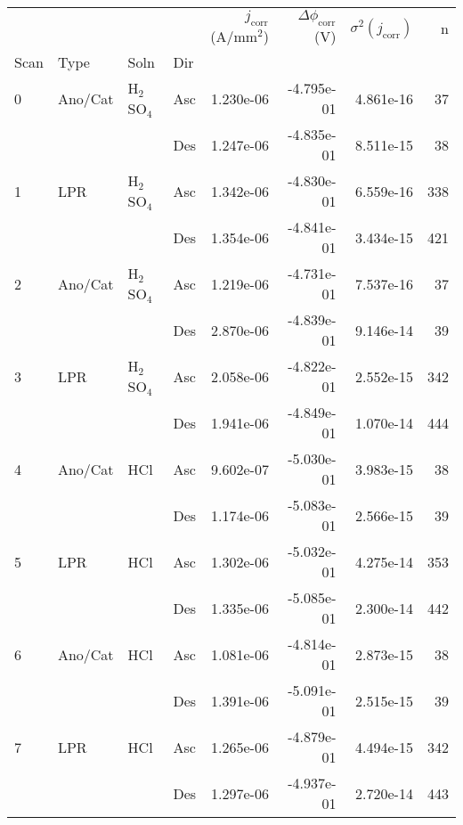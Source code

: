 \begin{tabular}{llllrrrr}
\toprule
  &     &     &     &  $j_{\text{corr}}$ (A/mm$^2$) &  $\Delta \phi_{\text{corr}}$ (V) &  $\sigma^2(j_{\text{corr}})$ &    n \\
Scan & Type & Soln & Dir &                               &                                  &                              &      \\
\midrule
0 & Ano/Cat & H$_2$SO$_4$ & Asc &                     1.230e-06 &                       -4.795e-01 &                    4.861e-16 &   37 \\
  &     &     & Des &                     1.247e-06 &                       -4.835e-01 &                    8.511e-15 &   38 \\
1 & LPR & H$_2$SO$_4$ & Asc &                     1.342e-06 &                       -4.830e-01 &                    6.559e-16 &  338 \\
  &     &     & Des &                     1.354e-06 &                       -4.841e-01 &                    3.434e-15 &  421 \\
2 & Ano/Cat & H$_2$SO$_4$ & Asc &                     1.219e-06 &                       -4.731e-01 &                    7.537e-16 &   37 \\
  &     &     & Des &                     2.870e-06 &                       -4.839e-01 &                    9.146e-14 &   39 \\
3 & LPR & H$_2$SO$_4$ & Asc &                     2.058e-06 &                       -4.822e-01 &                    2.552e-15 &  342 \\
  &     &     & Des &                     1.941e-06 &                       -4.849e-01 &                    1.070e-14 &  444 \\
4 & Ano/Cat & HCl & Asc &                     9.602e-07 &                       -5.030e-01 &                    3.983e-15 &   38 \\
  &     &     & Des &                     1.174e-06 &                       -5.083e-01 &                    2.566e-15 &   39 \\
5 & LPR & HCl & Asc &                     1.302e-06 &                       -5.032e-01 &                    4.275e-14 &  353 \\
  &     &     & Des &                     1.335e-06 &                       -5.085e-01 &                    2.300e-14 &  442 \\
6 & Ano/Cat & HCl & Asc &                     1.081e-06 &                       -4.814e-01 &                    2.873e-15 &   38 \\
  &     &     & Des &                     1.391e-06 &                       -5.091e-01 &                    2.515e-15 &   39 \\
7 & LPR & HCl & Asc &                     1.265e-06 &                       -4.879e-01 &                    4.494e-15 &  342 \\
  &     &     & Des &                     1.297e-06 &                       -4.937e-01 &                    2.720e-14 &  443 \\
\bottomrule
\end{tabular}
